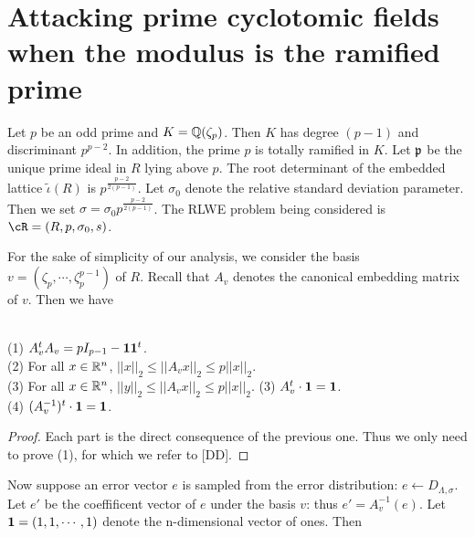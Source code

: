 \documentclass{amsart}
\begin{document}
\section{Attacking prime cyclotomic fields when the modulus is the ramified prime}
\label{sec: ramified-prime}

Let $p$ be an odd prime and $K = \mathbb{Q}(\zeta_p)$. Then $K$ has degree $(p-1)$ and discriminant $p^{p-2}$.
In addition, the prime $p$ is totally ramified in $K$. Let $\mathfrak{p}$ be the unique prime ideal  in $R$ lying above $p$. The root determinant of the embedded lattice $\tilde{\iota}(R)$ is $p^{\frac{p-2}{2(p-1)}}$. Let $\sigma_0$ denote the relative standard deviation parameter. Then we set $\sigma  = \sigma_0 p^{\frac{p-2}{2(p-1)}}$. The RLWE problem being considered is $\cR = (R, p, \sigma_0, s)$.



For the sake of simplicity of our analysis, we consider the basis  $v = (\zeta_p, \cdots, \zeta_{p}^{p-1})$ of $R$. Recall that $A_v$ denotes the canonical embedding matrix of $v$. Then we have

\begin{Lemma} \qquad \\
(1) $A_v^t A_v = pI_{p-1} - {\bf 1} {\bf 1}^t$.\\
(2) For all $x \in \mathbb{R}^n$, $||x||_2 \leq ||A_v x||_2 \leq p||x||_2$. \\
(3) For all $x \in \mathbb{R}^n$, $||y||_2 \leq ||A_v x||_2 \leq p||x||_2$.
(3) $A_v^t \cdot {\bf 1} = {\bf 1}$. \\
(4) $(A_v^{-1})^t \cdot {\bf 1} = {\bf 1}$.
\end{Lemma}

\begin{proof}
Each part is the direct consequence of the previous one. Thus we only need to prove (1), for which we refer to [DD].
\end{proof}

Now suppose an error vector $e$ is sampled from the error distribution: $e \gets D_{\Lambda, \sigma}$.  Let $e'$ be the coeffificent vector of $e$ under the basis $v$: thus $e' = A_v^{-1}(e)$. Let ${\bf 1} = (1,1, \cdots,1)$ denote the n-dimensional vector of ones. Then
\end{document}
